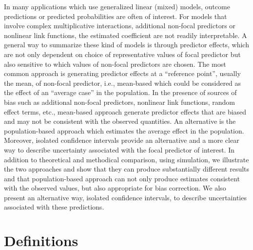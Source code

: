 \documentclass[10pt,letterpaper]{article}
\begin{document}
In many applications which use generalized linear (mixed) models, outcome predictions or predicted probabilities are often of interest. For models that involve complex multiplicative interactions, additional non-focal predictors or nonlinear link functions, the estimated coefficient are not readily interpretable. A general way to summarize these kind of models is through predictor effects, which are not only dependent on choice of representative values of focal predictor but also sensitive to which values of non-focal predictors are chosen. The most common approach is generating predictor effects at a ``reference point'', usually the mean, of non-focal predictor, i.e., mean-based which could be considered as the effect of an ``average case'' in the population. In the presence of sources of bias such as additional non-focal predictors, nonlinear link functions, random effect terms, etc., mean-based approach generate predictor effects that are biased and may not be consistent with the observed quantities. An alternative is the population-based approach which estimates the average effect in the population. Moreover, isolated confidence intervals provide an alternative and a more clear way to describe uncertainty associated with the focal predictor of interest. In addition to theoretical and methodical comparison, using simulation, we illustrate the two approaches and show that they can produce substantially different results and that population-based approach can not only produce estimates consistent with the observed values, but also appropriate for bias correction. We also present an alternative way, isolated confidence intervals, to describe uncertainties associated with these predictions.

\section*{Definitions}
\end{document}

